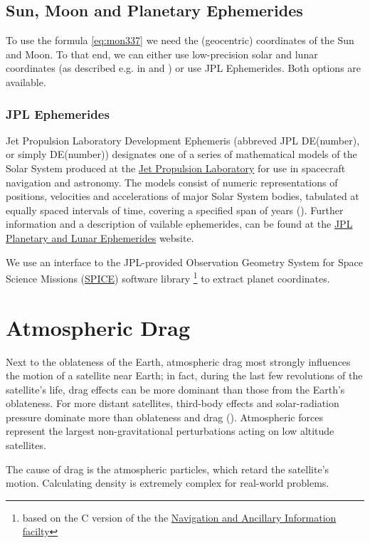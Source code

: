\subsection{Sun, Moon and Planetary Ephemerides}
To use the formula \ref{eq:mon337} we need the (geocentric) coordinates of the 
Sun and Moon. To that end, we can either use low-precision solar and lunar 
coordinates (as described e.g. in \cite{Montenbruck2000} and \cite{Vallado}) or 
use JPL Ephemerides. Both options are available.

\subsubsection{JPL Ephemerides}
Jet Propulsion Laboratory Development Ephemeris (abbreved JPL DE(number), or 
simply DE(number)) designates one of a series of mathematical models of the 
Solar System produced at the \href{https://www.jpl.nasa.gov/}{Jet Propulsion Laboratory} 
for use in spacecraft navigation and astronomy. The models consist of numeric 
representations of positions, velocities and accelerations of major Solar System 
bodies, tabulated at equally spaced intervals of time, covering a specified 
span of years (\cite{wiki-jplde}). Further information and a description of 
vailable ephemerides, can be found at the 
\href{https://ssd.jpl.nasa.gov/planets/eph_export.html}{JPL Planetary and Lunar Ephemerides} website.

We use an interface to the JPL-provided Observation Geometry System
for Space Science Missions (\href{https://naif.jpl.nasa.gov/naif/}{SPICE}) 
software library \footnote{based on the C version of the the 
\href{https://naif.jpl.nasa.gov/naif/toolkit_C.html}{Navigation and Ancillary Information facilty}} 
to extract planet coordinates. 

\section{Atmospheric Drag}
Next to the oblateness of the Earth, atmospheric drag most strongly influences the
motion of a satellite near Earth; in fact, during the last few revolutions of the satellite's
life, drag effects can be more dominant than those from the Earth's oblateness. For more
distant satellites, third-body effects and solar-radiation pressure dominate more than
oblateness and drag (\cite{Vallado}). Atmospheric forces represent the largest 
non-gravitational perturbations acting on low altitude satellites.

The cause of drag is the atmospheric particles, which retard the satellite's motion.
Calculating density is extremely complex for real-world problems.

